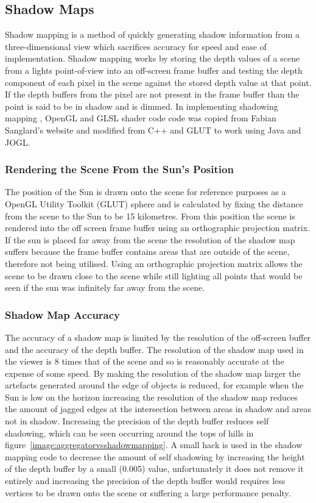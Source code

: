 \documentclass[12pt]{report}
\begin{document}
\subsection{Shadow Maps}
Shadow mapping is a method of quickly generating shadow information from a three-dimensional view which sacrifices accuracy for speed and ease of implementation. Shadow mapping works by storing the depth values of a scene from a lights point-of-view into an off-screen frame buffer and testing the depth component of each pixel in the scene against the stored depth value at that point. If the depth buffers from the pixel are not present in the frame buffer than the point is said to be in shadow and is dimmed. In implementing shadowing mapping , OpenGL and GLSL shader code code was copied from Fabian Sanglard's website\cite{shadowb} and modified from C++ and GLUT to work using Java and JOGL.

\subsubsection{Rendering the Scene From the Sun's Position}
The position of the Sun is drawn onto the scene for reference purposes as a OpenGL Utility Toolkit (GLUT) sphere and is calculated by fixing the distance from the scene to the Sun to be 15 kilometres. From this position the scene is rendered into the off screen frame buffer using an orthographic projection matrix. If the sun is placed far away from the scene the resolution of the shadow map suffers because the frame buffer contains areas that are outside of the scene, therefore not being utilised. Using an orthographic projection matrix allows the scene to be drawn close to the scene while still lighting all points that would be seen if the sun was infinitely far away from the scene.

\subsubsection{Shadow Map Accuracy}
The accuracy of a shadow map is limited by the resolution of the off-screen buffer and the accuracy of the depth buffer. The resolution of the shadow map used in the viewer is 8 times that of the scene and so is reasonably accurate at the expense of some speed. By making the resolution of the shadow map larger the artefacts generated around the edge of objects is reduced, for example when the Sun is low on the horizon increasing the resolution of the shadow map reduces the amount of jagged edges at the intersection between areas in shadow and areas not in shadow. Increasing the precision of the depth buffer reduces self shadowing, which can be seen occurring around the tops of hills in figure~\ref{image:aggregatorvsshadowmapping}. A small hack is used in the shadow mapping code to decrease the amount of self shadowing by increasing the height of the depth buffer by a small (0.005) value, unfortunately it does not remove it entirely and increasing the precision of the depth buffer would requires less vertices to be drawn onto the scene or suffering a large performance penalty.
\end{document}
